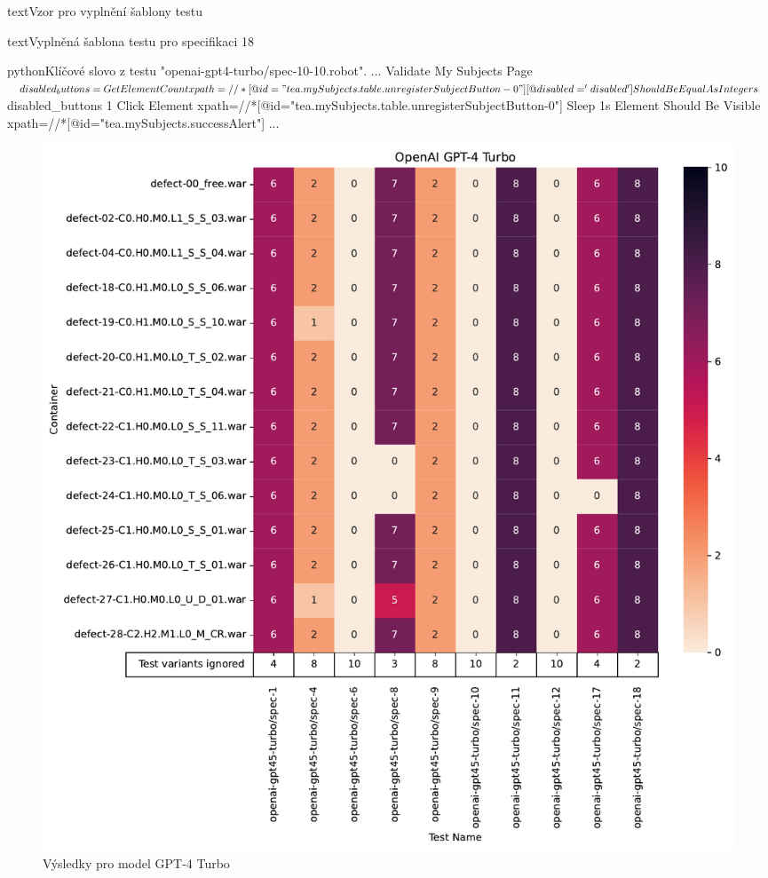 \documentclass[czech, ma, kiv, he, iso690numb, pdf, viewonly]{fasthesis}
\begin{document}
\begin{code}{text}{Vzor pro vyplnění šablony testu \label{lst:template}}
{\begin{code}{text}{Vyplněná šablona testu pro specifikaci 18 \label{lst:spec18}}
{            \begin{code}{python}{Klíčové slovo z testu "openai-gpt4-turbo/spec-10-10.robot". \label{lst:gpt-4-turbo:spec-10-10}}
...
Validate My Subjects Page
    ${disabled_buttons}=    Get Element Count    xpath=//*[@id="tea.mySubjects.table.unregisterSubjectButton-0"][@disabled='disabled']
    Should Be Equal As Integers    ${disabled_buttons}    1
    Click Element    xpath=//*[@id="tea.mySubjects.table.unregisterSubjectButton-0"]
    Sleep    1s
    Element Should Be Visible    xpath=//*[@id="tea.mySubjects.successAlert"]
...
            \end{code}


            \begin{figure}
                \includegraphics[width=\textwidth]{pic/gpt-4-turbo-results.pdf}
                \caption{Výsledky pro model GPT-4 Turbo}
                \label{fig:res:gpt-4-turbo}
            \end{figure}

}
\end{code}}
\end{code}
\end{document}

